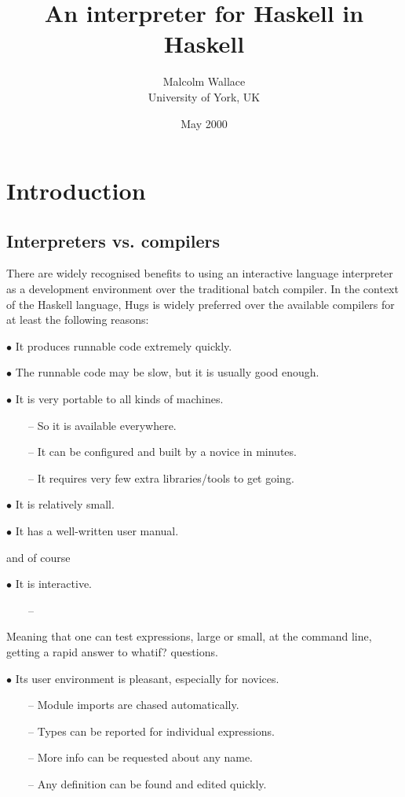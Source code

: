 \documentclass[a4paper]{article}
\title{An interpreter for Haskell in Haskell}
\author{Malcolm Wallace \\ University of York, UK}
\date{May 2000}
\begin{document}
\maketitle


\section*{Introduction}

\subsection*{Interpreters vs. compilers}

There are widely recognised benefits to using an interactive language
interpreter as a development environment over the traditional batch
compiler.  In the context of the Haskell language, Hugs is widely
preferred over the available compilers for at least the following
reasons:

$\bullet$  It produces runnable code extremely quickly.

$\bullet$  The runnable code may be slow, but it is usually good enough.

$\bullet$  It is very portable to all kinds of machines.

\ \ \ \ --
           So it is available everywhere.

\ \ \ \ --
           It can be configured and built by a novice in minutes.

\ \ \ \ --
           It requires very few extra libraries/tools to get going.

$\bullet$ It is relatively small.

$\bullet$ It has a well-written user manual.

\noindent
and of course

$\bullet$
    It is interactive.

\ \ \ \ --
      \parbox[t]{10cm}{
        Meaning that one can test expressions, large or small,
        at the command line, getting a rapid answer to whatif? questions.}

$\bullet$
    Its user environment is pleasant, especially for novices.

\ \ \ \ --
      Module imports are chased automatically.

\ \ \ \ --
      Types can be reported for individual expressions.

\ \ \ \ --
      More info can be requested about any name.

\ \ \ \ --
      Any definition can be found and edited quickly.
\end{document}
